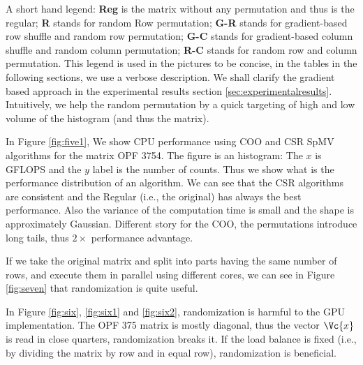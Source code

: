 \documentclass[manuscript,screen]{acmart}
\begin{document}
A short hand legend: {\bf Reg} is the matrix without any permutation
and thus is the regular; {\bf R} stands for random Row permutation;
{\bf G-R} stands for gradient-based row shuffle and random row
permutation; {\bf G-C} stands for gradient-based column shuffle and
random column permutation; {\bf R-C} stands for random row and column
permutation.  This legend is used in the pictures to be concise, in
the tables in the following sections, we use a verbose description. We
shall clarify the gradient based approach in the experimental results
section \ref{sec:experimentalresults}. Intuitively, we help the random
permutation by a quick targeting of high and low volume of the
histogram (and thus the matrix).


In Figure \ref{fig:five1}, We show CPU performance using COO and CSR
SpMV algorithms for the matrix OPF 3754. The figure is an histogram:
The $x$ is GFLOPS and the $y$ label is the number of counts. Thus we
show what is the performance distribution of an algorithm.  We can see
that the CSR algorithms are consistent and the Regular (i.e., the
original) has always the best performance. Also the variance of the
computation time is small and the shape is approximately Gaussian.
Different story for the COO, the permutations introduce long tails,
thus $2\times$ performance advantage.

If we take the original matrix and split into parts having the same
number of rows, and execute them in parallel using different cores, we
can see in Figure \ref{fig:seven} that randomization is quite useful.


In Figure \ref{fig:six}, \ref{fig:six1} and \ref{fig:six2},
randomization is harmful to the GPU implementation. The OPF 375 matrix
is mostly diagonal, thus the vector $\Vc{x}$ is read in close
quarters, randomization breaks it.  If the load balance is fixed
(i.e., by dividing the matrix by row and in equal row), randomization
is beneficial.

\end{document}
